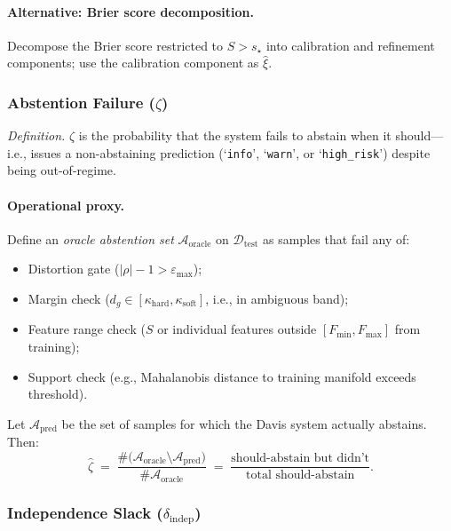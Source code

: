 \documentclass[11pt]{article}
\begin{document}
\paragraph{Alternative: Brier score decomposition.}
Decompose the Brier score restricted to $S > s_\star$ into calibration and refinement components; use the calibration component as $\hat\xi$.

\subsubsection{Abstention Failure ($\zeta$)}
\label{subsubsec:zeta}

\emph{Definition.} $\zeta$ is the probability that the system fails to abstain when it should—i.e., issues a non-abstaining prediction (`\texttt{info}', `\texttt{warn}', or `\texttt{high\_risk}') despite being out-of-regime.

\paragraph{Operational proxy.}
Define an \emph{oracle abstention set} $\mathcal{A}_{\text{oracle}}$ on $\mathcal{D}_{\mathrm{test}}$ as samples that fail any of:
\begin{itemize}[leftmargin=*]
  \item Distortion gate ($|\rho| - 1 > \varepsilon_{\text{max}}$);
  \item Margin check ($d_g \in [\kappa_{\mathrm{hard}}, \kappa_{\mathrm{soft}}]$, i.e., in ambiguous band);
  \item Feature range check ($S$ or individual features outside $[F_{\min}, F_{\max}]$ from training);
  \item Support check (e.g., Mahalanobis distance to training manifold exceeds threshold).
\end{itemize}

Let $\mathcal{A}_{\text{pred}}$ be the set of samples for which the Davis system actually abstains. Then:
\[
\hat\zeta
\;=\;
\frac{\#\bigl(\mathcal{A}_{\text{oracle}} \setminus \mathcal{A}_{\text{pred}}\bigr)}{\#\mathcal{A}_{\text{oracle}}}
\;=\;
\frac{\text{should-abstain but didn't}}{\text{total should-abstain}}.
\]

\subsubsection{Independence Slack ($\delta_{\mathrm{indep}}$)}
\label{subsubsec:deltaindep}
\end{document}
